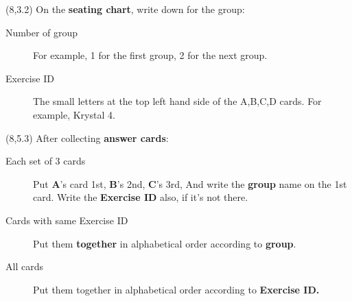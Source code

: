 \documentclass[a4paper]{article}
\begin{document}

\TPshowboxestrue
\begin{textblock}{7.5}(8,3.2)
\large On the \textbf{seating chart}, write down for the group:
\begin{description}
\item [Number of group] For example, 1 for the first group, 2 for the next group.
\item [Exercise ID] The small letters at the top left hand side of the A,B,C,D cards. For example, Krystal 4.
\end{description}
\end{textblock}
\TPshowboxesfalse

\TPshowboxestrue
\begin{textblock}{7.5}(8,5.3)
\large After collecting \textbf{answer cards}:
\begin{description}
\item [Each set of 3 cards] Put \textbf{A}'s card 1st, \textbf{B}'s 2nd, \textbf{C}'s 3rd, And write the \textbf{group} name on the 1st card. Write the \textbf{Exercise ID} also, if it's not there.
\item [Cards with same Exercise ID] Put them \textbf{together} in alphabetical order according to \textbf{group}.
\item [All cards] Put them together in alphabetical order according to \textbf{Exercise ID.}
\end{description}
\end{textblock}
\TPshowboxesfalse
\end{document}
